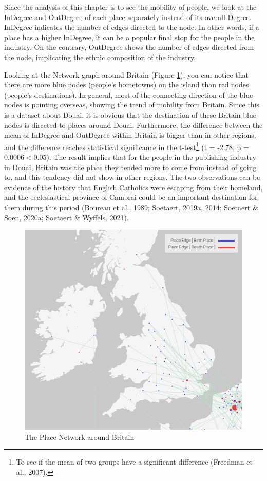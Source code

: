 \documentclass[12pt,a4paper,oneside]{book}
\begin{document}
\begin{sloppypar}
\pagebreak
Since the analysis of this chapter is to see the mobility of people, we look at the InDegree and OutDegree of each place separately instead of its overall Degree. InDegree indicates the number of edges directed to the node. In other words, if a place has a higher InDegree, it can be a popular final stop for the people in the industry. On the contrary, OutDegree shows the number of edges directed from the node, implicating the ethnic composition of the industry.

Looking at the Network graph around Britain (Figure \ref{fig:britNet}), you can notice that there are more blue nodes (people’s hometowns) on the island than red nodes (people’s destinations). In general, most of the connecting direction of the blue nodes is pointing overseas, showing the trend of mobility from Britain. Since this is a dataset about Douai, it is obvious that the destination of these Britain blue nodes is directed to places around Douai. Furthermore, the difference between the mean of InDegree and OutDegree within Britain is bigger than in other regions, and the difference reaches statistical significance in the t-test\footnote{To see if the mean of two groups have a significant difference (Freedman et al., 2007).} (t = -2.78, p = $0.0006 < 0.05$). The result implies that for the people in the publishing industry in Douai, Britain was the place they tended more to come from instead of going to, and this tendency did not show in other regions. The two observations can be evidence of the history that English Catholics were escaping from their homeland, and the ecclesiastical province of Cambrai could be an important destination for them during this period (Boureau et al., 1989; Soetaert, 2019a, 2014; Soetaert \& Soen, 2020a; Soetaert \& Wyffels, 2021).

\begin{figure}[H]
\centering
\includegraphics[scale=0.7]{graph/Place Network (Britain).png}
\caption{The Place Network around Britain}
\label{fig:britNet}
\end{figure}


\end{sloppypar}
\end{document}
